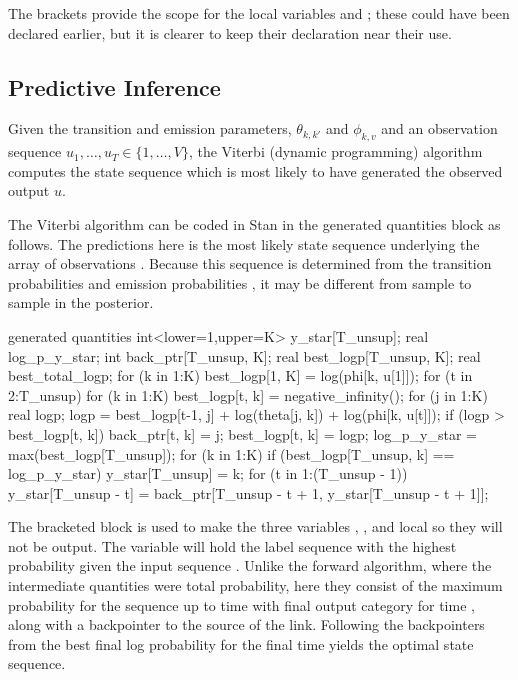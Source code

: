 The brackets provide the scope for the local variables  and
; these could have been declared earlier, but it is
clearer to keep their declaration near their use. 


\subsection{Predictive Inference}

Given the transition and emission parameters, $\theta_{k, k'}$ and
$\phi_{k,v}$ and an observation sequence $u_1,\ldots,u_T \in \{
1,\ldots,V \}$, the Viterbi (dynamic programming) algorithm
computes the state sequence which is most likely to have generated the
observed output $u$.  

The Viterbi algorithm can be coded in Stan in the generated quantities
block as follows.  The predictions here is the most likely state
sequence  underlying the
array of observations .  Because this
sequence is determined from the transition probabilities
 and emission probabilities , it may be
different from sample to sample in the posterior.
%
\begin{stancode}
generated quantities {
  int<lower=1,upper=K> y_star[T_unsup];
  real log_p_y_star;
  { 
    int back_ptr[T_unsup, K];
    real best_logp[T_unsup, K];
    real best_total_logp;
    for (k in 1:K)
      best_logp[1, K] = log(phi[k, u[1]]);
    for (t in 2:T_unsup) {
      for (k in 1:K) {
        best_logp[t, k] = negative_infinity();
        for (j in 1:K) {
          real logp;
          logp = best_logp[t-1, j] 
                  + log(theta[j, k]) + log(phi[k, u[t]]);
          if (logp > best_logp[t, k]) {
            back_ptr[t, k] = j;
            best_logp[t, k] = logp;
          }
        }
      }
    }
    log_p_y_star = max(best_logp[T_unsup]);
    for (k in 1:K)
      if (best_logp[T_unsup, k] == log_p_y_star)
        y_star[T_unsup] = k;
    for (t in 1:(T_unsup - 1))
      y_star[T_unsup - t] = back_ptr[T_unsup - t + 1, 
                                      y_star[T_unsup - t + 1]];
  }
}
\end{stancode}
%
The bracketed block is used to make the three variables
, , and 
local so they will not be output.  The variable  will
hold the label sequence with the highest probability given the input
sequence .  Unlike the forward algorithm, where the
intermediate quantities were total probability, here they consist of
the maximum probability  for the sequence up to
time  with final output category  for time ,
along with a backpointer to the source of the link.  Following the
backpointers from the best final log probability for the final time
 yields the optimal state sequence.

